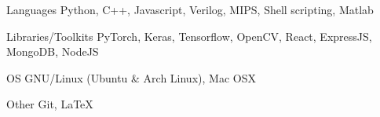 

\begin{cvskills}

  \cvskill
    {Languages} %
    {Python, C++, Javascript, Verilog, MIPS, Shell scripting, Matlab} %

  \cvskill
    {Libraries/Toolkits} %
    {PyTorch, Keras, Tensorflow, OpenCV, React, ExpressJS, MongoDB, NodeJS} %

  \cvskill
    {OS} %
    {GNU/Linux (Ubuntu \& Arch Linux), Mac OSX} %

  \cvskill
    {Other} %
    {Git, \LaTeX} %
\end{cvskills}

